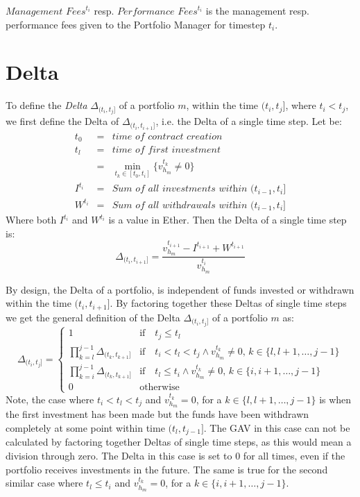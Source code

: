 \documentclass[9pt,oneside]{amsart}
\theoremstyle{plain}
\begin{document}
$\textit{Management Fees}^{t_i}$ resp. $\textit{Performance Fees}^{t_i}$ is the management resp. performance fees given to the Portfolio Manager for timestep $t_i$.

\section{Delta}\label{app:defdelta}

To define the \textit{Delta} $\Delta_{(t_i, t_j]}$ of a portfolio $m$, within the time $(t_i, t_j]$, where $t_i < t_j$, we first define the Delta of $\Delta_{(t_i, t_{i+1}]}$, i.e. the Delta of a single time step.
Let be:
\begin{eqnarray*}
	t_0 &=& \textit{time of contract creation} \\
	t_l &=& \textit{time of first investment} \\
	&=& \min_{t_k \in [t_0, t_i]} \{v_{h_m}^{t_k} \neq 0\} \\
	I^{t_i} &=& \textit{Sum of all investments within $(t_{i-1}, t_i]$} \\
	W^{t_i} &=& \textit{Sum of all withdrawals within $(t_{i-1}, t_i]$}
\end{eqnarray*}
Where both $I^{t_i}$ and $W^{t_i}$ is a value in Ether. Then the Delta of a single time step is:
\begin{equation}
	\Delta_{(t_i, t_{i+1}]} = 
		\frac{v_{h_m}^{t_{i+1}} - 
			I^{t_{i +1}} + W^{t_{i +1}}}{v_{h_m}^{t_i}}
\end{equation}

By design, the Delta of a portfolio, is independent of funds invested or withdrawn within the time $(t_i, t_{i+1}]$. By factoring together these Deltas of single time steps we get the general definition of the Delta $\Delta_{(t_i, t_j]}$ of a portfolio $m$ as:
\begin{equation}
	\Delta_{(t_i, t_j]} = \begin{cases}
		1 & \text{if} \quad t_j \leq t_l \\
		\prod\limits_{k = l}^{j - 1} \Delta_{(t_k, t_{k + 1}]} & \text{if} \quad t_i < t_l < t_j \wedge  v_{h_m}^{t_k} \neq 0, \, k \in \{l, l + 1, \hdots, j - 1\}\\
		\prod\limits_{k = i}^{j - 1} \Delta_{(t_k, t_{k + 1}]} & \text{if} \quad t_l \leq t_i \wedge  v_{h_m}^{t_k} \neq 0, \, k \in \{i, i + 1, \hdots, j - 1\}\\
		0 & \text{otherwise}
	\end{cases}
\end{equation}
Note, the case where $t_i < t_l < t_j$ and $v_{h_m}^{t_k} = 0$, for a $k \in \{l, l + 1, \hdots, j - 1\}$ is when the first investment has been made but the funds have been withdrawn completely at some point within time $(t_l, t_{j-1}]$. The GAV in this case can not be calculated by factoring together Deltas of single time steps, as this would mean a division through zero. The Delta in this case is set to $0$ for all times, even if the portfolio receives investments in the future. The same is true for the second similar case where $t_l \leq t_i$ and $v_{h_m}^{t_k} = 0$, for a $k \in \{i, i + 1, \hdots, j - 1\}$.
\end{document}
